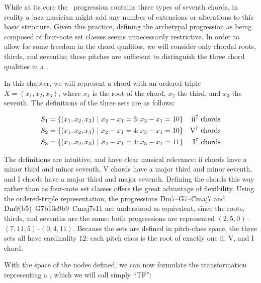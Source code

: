 \documentclass[diss]{subfiles}
\begin{document}
While at its core the \tfo\ progression contains three types of seventh
chords, in reality a jazz musician might add any number of extensions or
alterations to this basic structure. Given this practice, defining the
archetypal progression as being composed of four-note set classes seems
unnecessarily restrictive. In order to allow for some freedom in the chord
qualities, we will consider only chordal roots, thirds, and sevenths; these
pitches are sufficient to distinguish the three chord qualities in a \tfo.

In this chapter, we will represent a chord with an ordered triple $X = (x_1,
x_2, x_3)$, where $x_1$ is the root of the chord, $x_2$ the third, and $x_3$
the seventh. The definitions of the three sets are as follows:

\vspace{-3em} %
\begin{align*}
  S_1 &= \{ (x_1, x_2, x_3)\ |\ x_2 - x_1 = 3; x_3 - x_1 = 10 \} &
    \text{ii\tsup{7} chords} \\ %
  S_2 &= \{ (x_1, x_2, x_3)\ |\ x_2 - x_1 = 4; x_3 - x_1 = 10 \} &
    \text{V\tsup{7} chords} \\ %
  S_3 &= \{ (x_1, x_2, x_3)\ |\ x_2 - x_1 = 4; x_3 - x_1 = 11 \} &
    \text{I\tsup{7} chords}
\end{align*}
\vspace{-3em}

\noindent The definitions are intuitive, and have clear musical relevance:
ii chords have a minor third and minor seventh, V chords have
a major third and minor seventh, and I chords have a major third and
major seventh. Defining the chords this way rather than as four-note set
classes offers the great advantage of flexibility. Using the ordered-triple
representation, the progressions \h{Dm7}--\h{G7}--\h{Cmaj7} and
\h{Dm9(b5)}--\h{G7b13s9b9}--\h{Cmaj7s11} are understood as equivalent, since
the roots, thirds, and sevenths are the same: both progressions are
represented $(2, 5, 0)$--\allowbreak$(7, 11, 5)$--\allowbreak$(0, 4,
11)$. Because the sets are defined in pitch-class space, the three sets all
have cardinality $12$: each pitch class is the root of exactly one ii,
V, and I chord.

With the space of the nodes defined, we can now formulate the transformation
representing a \tf, which we will call simply ``TF'':
\end{document}
